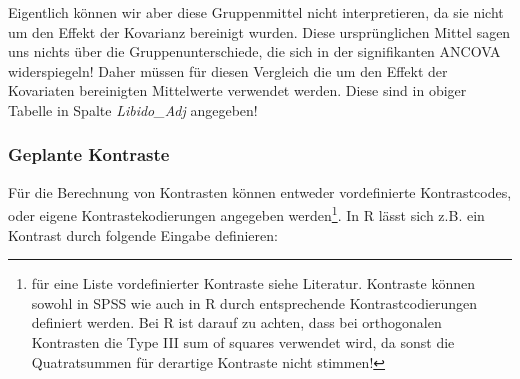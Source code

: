 \documentclass[]{article}
\let\rmarkdownfootnote\footnote%
\def\footnote{\protect\rmarkdownfootnote}
\begin{document}
Eigentlich können wir aber diese Gruppenmittel nicht interpretieren, da
sie nicht um den Effekt der Kovarianz bereinigt wurden. Diese
ursprünglichen Mittel sagen uns nichts über die Gruppenunterschiede, die
sich in der signifikanten ANCOVA widerspiegeln! Daher müssen für diesen
Vergleich die um den Effekt der Kovariaten bereinigten Mittelwerte
verwendet werden. Diese sind in obiger Tabelle in Spalte
\emph{Libido\_Adj} angegeben!

\subsubsection*{Geplante Kontraste}\label{geplante-kontraste}

Für die Berechnung von Kontrasten können entweder vordefinierte
Kontrastcodes, oder eigene Kontrastekodierungen angegeben
werden\footnote{für eine Liste vordefinierter Kontraste siehe Literatur.
  Kontraste können sowohl in SPSS wie auch in R durch entsprechende
  Kontrastcodierungen definiert werden. Bei R ist darauf zu achten, dass
  bei orthogonalen Kontrasten die Type III sum of squares verwendet
  wird, da sonst die Quatratsummen für derartige Kontraste nicht
  stimmen!}. In R lässt sich z.B. ein Kontrast durch folgende Eingabe
definieren:
\end{document}
